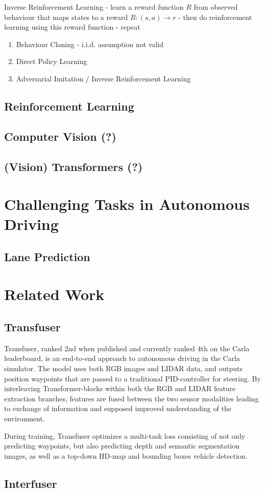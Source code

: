 Inverse Reinforcement Learning
- learn a reward function $R$ from observed behaviour that maps states to a reward $R: (s, a) \rightarrow r$
- then do reinforcement learning using this reward function
- repeat 


\begin{enumerate}
    \item Behaviour Cloning - i.i.d. assumption not valid
    \item Direct Policy Learning
    \item Adversarial Imitation / Inverse Reinforcement Learning
\end{enumerate}

\subsection{Reinforcement Learning}

\subsection{Computer Vision (?)}

\subsection{(Vision) Transformers (?)}


\section{Challenging Tasks in Autonomous Driving}

\subsection{Lane Prediction}


\section{Related Work}

\subsection{Transfuser}
Transfuser, ranked 2nd when published and currently ranked 4th on the Carla leaderboard,
is an end-to-end approach to autonomous driving in the Carla simulator.
\cite{transfuser-pami} \cite{transfuser-cvpr} \cite{pwc-carla}
The model uses both RGB images and LIDAR data, and outputs position waypoints that are passed to a traditional PID-controller for steering.
By interleaving Transformer-blocks within both the RGB and LIDAR feature extraction branches,
features are fused between the two sensor modalities leading to exchange of information and supposed improved understanding of the environment.

During training, Transfuser optimizes a multi-task loss consisting of not only predicting waypoints,
but also predicting depth and semantic segmentation images,
as well as a top-down HD-map and bounding boxes vehicle detection.



\subsection{Interfuser}
